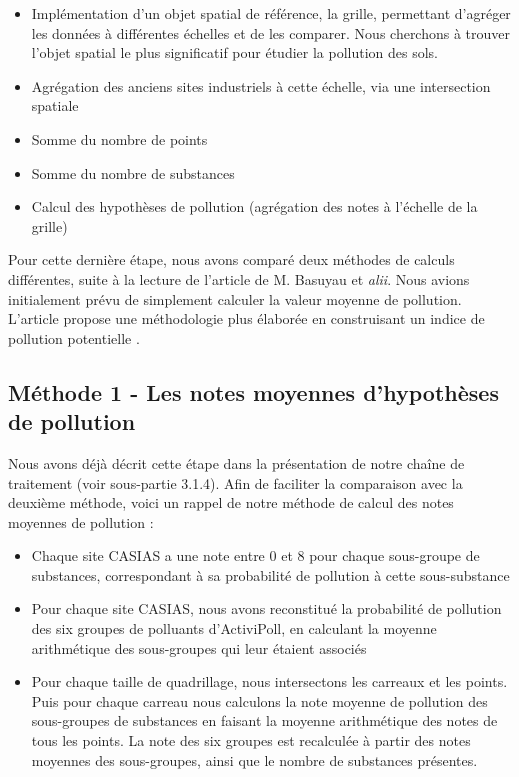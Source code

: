 \documentclass[a4paper,twoside,12pt]{book}
\begin{document}
\begin{itemize}
\item Implémentation d’un objet spatial de référence, la grille, permettant d’agréger les données à différentes échelles et de les comparer. Nous cherchons à trouver l’objet spatial le plus significatif pour étudier la pollution des sols. 
\item Agrégation des anciens sites industriels à cette échelle, via une intersection spatiale
\item Somme du nombre de points
\item Somme du nombre de substances
\item Calcul des hypothèses de pollution (agrégation des notes à l'échelle de la grille)
\end{itemize}

Pour cette dernière étape, nous avons comparé deux méthodes de calculs différentes, suite à la lecture de l'article de M. Basuyau et \textit{alii}. Nous avions initialement prévu de simplement calculer la valeur moyenne de pollution. L'article propose une méthodologie plus élaborée en construisant un \og{} indice de pollution potentielle \fg{}. 

\subsection{Méthode 1 - Les notes moyennes d'hypothèses de pollution}
Nous avons déjà décrit cette étape dans la présentation de notre chaîne de traitement  (voir sous-partie 3.1.4). Afin de faciliter la comparaison avec la deuxième méthode, voici un rappel de notre méthode de calcul des notes moyennes de pollution : 
\begin{itemize}
\item Chaque site CASIAS a une note entre 0 et 8 pour chaque sous-groupe de substances, correspondant à sa probabilité de pollution à cette sous-substance
\item Pour chaque site CASIAS, nous avons reconstitué la probabilité de pollution des six groupes de polluants d'ActiviPoll, en calculant la moyenne arithmétique des sous-groupes qui leur étaient associés
\item Pour chaque taille de quadrillage, nous intersectons les carreaux et les points. Puis pour chaque carreau nous calculons la note moyenne de pollution des sous-groupes de substances en faisant la moyenne arithmétique des notes de tous les points. La note des six groupes est recalculée à partir des notes moyennes des sous-groupes, ainsi que le nombre de substances présentes. 
\end{itemize}
\end{document}
